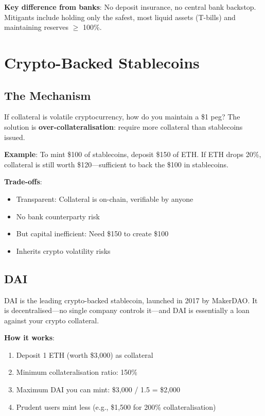 \documentclass[11pt,a4paper]{article}
\newcommand{\keyword}[1]{\textbf{\textcolor{AccentOrange}{#1}}}
\begin{document}
\textbf{Key difference from banks}: No deposit insurance, no central bank backstop. Mitigants include holding only the safest, most liquid assets (T-bills) and maintaining reserves $\geq$ 100\%.

\section{Crypto-Backed Stablecoins}

\subsection{The Mechanism}

If collateral is volatile cryptocurrency, how do you maintain a \$1 peg? The solution is \keyword{over-collateralisation}: require more collateral than stablecoins issued.

\textbf{Example}: To mint \$100 of stablecoins, deposit \$150 of ETH. If ETH drops 20\%, collateral is still worth \$120---sufficient to back the \$100 in stablecoins.

\textbf{Trade-offs}:
\begin{itemize}
    \item Transparent: Collateral is on-chain, verifiable by anyone
    \item No bank counterparty risk
    \item But capital inefficient: Need \$150 to create \$100
    \item Inherits crypto volatility risks
\end{itemize}

\subsection{DAI}

DAI is the leading crypto-backed stablecoin, launched in 2017 by MakerDAO. It is decentralised---no single company controls it---and DAI is essentially a loan against your crypto collateral.

\textbf{How it works}:
\begin{enumerate}
    \item Deposit 1 ETH (worth \$3,000) as collateral
    \item Minimum collateralisation ratio: 150\%
    \item Maximum DAI you can mint: \$3,000 / 1.5 = \$2,000
    \item Prudent users mint less (e.g., \$1,500 for 200\% collateralisation)
\end{enumerate}
\end{document}
